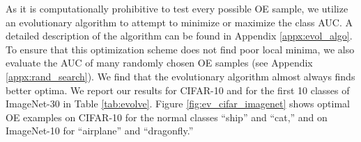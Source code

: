 \documentclass[10pt]{article} \usepackage[accepted]{stylefiles/tmlr}
\begin{document}
As it is computationally prohibitive to test every possible OE sample, we utilize an evolutionary algorithm to attempt to minimize or maximize the class AUC.
A detailed description of the algorithm can be found in Appendix \ref{appx:evol_algo}.
To ensure that this optimization scheme does not find poor local minima, we also evaluate the AUC of many randomly chosen OE samples (see Appendix \ref{appx:rand_search}). 
We find that the evolutionary algorithm almost always finds better optima.
We report our results for CIFAR-10 and for the first 10 classes of ImageNet-30 in Table \ref{tab:evolve}.
Figure \ref{fig:ev_cifar_imagenet} shows optimal OE examples on CIFAR-10 for the normal classes ``ship'' and ``cat,'' and on ImageNet-10 for ``airplane'' and ``dragonfly.'' 
\begin{figure*}[ht]
    \begin{center}
        \small
        \begin{minipage}[t]{1mm}
        \end{minipage}
        \begin{minipage}[t]{1mm}
        \end{minipage}
    \end{center}
    \caption{OE samples for CIFAR-10 with 80MTI as OE (a-b) and for ImageNet-10 with ImageNet-22k as OE (c-d). The first row shows normal samples, the next two rows show the best samples for HSC (top) and BCE (bottom), and the last two rows show the worst samples for HSC (top) and BCE (bottom).}
    \label{fig:ev_cifar_imagenet}
\end{figure*}
\end{document}
